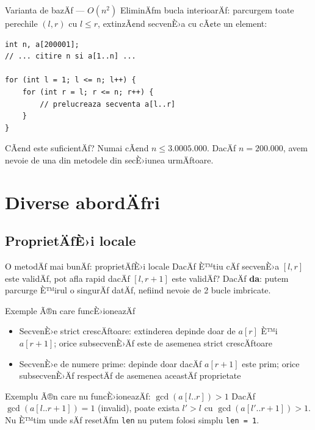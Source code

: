 \documentclass{beamer}
\begin{document}
\begin{frame}[fragile]{Varianta de bazÄƒ --- $O(n^2)$}
  EliminÄƒm bucla interioarÄƒ: parcurgem toate perechile $(l, r)$ cu $l \leq r$, extinzÃ¢nd secvenÈ›a cu cÃ¢te un element:
  \begin{lstlisting}
int n, a[200001];
// ... citire n si a[1..n] ...

for (int l = 1; l <= n; l++) {
    for (int r = l; r <= n; r++) {
        // prelucreaza secventa a[l..r]
    }
}
  \end{lstlisting}
  \begin{block}{CÃ¢nd este suficientÄƒ?}
    Numai cÃ¢nd $n \leq 3{.}000$\textendash$5{.}000$.
    DacÄƒ $n = 200{.}000$, avem nevoie de una din metodele din secÈ›iunea urmÄƒtoare.
  \end{block}
\end{frame}

\section{Diverse abordÄƒri}

\subsection{ProprietÄƒÈ›i locale}

\begin{frame}[shrink]{O metodÄƒ mai bunÄƒ: proprietÄƒÈ›i locale}
  DacÄƒ È™tiu cÄƒ secvenÈ›a $[l, r]$ este validÄƒ, pot afla rapid dacÄƒ $[l, r+1]$ este validÄƒ? DacÄƒ \textbf{da}: putem parcurge È™irul o singurÄƒ datÄƒ, nefiind nevoie de 2 bucle imbricate.
  \smallskip
  \begin{block}{Exemple Ã®n care funcÈ›ioneazÄƒ}
    \begin{itemize}
      \item SecvenÈ›e strict crescÄƒtoare: extinderea depinde doar de $a[r]$ È™i $a[r+1]$; orice subsecvenÈ›Äƒ este de asemenea strict crescÄƒtoare
      \item SecvenÈ›e de numere prime: depinde doar dacÄƒ $a[r+1]$ este prim; orice subsecvenÈ›Äƒ respectÄƒ de asemenea aceastÄƒ proprietate
    \end{itemize}
  \end{block}
  \begin{alertblock}{Exemplu Ã®n care nu funcÈ›ioneazÄƒ: $\gcd(a[l..r]) > 1$}
    DacÄƒ $\gcd(a[l..r{+}1]) = 1$ (invalid), poate exista $l' > l$ cu $\gcd(a[l'..r{+}1]) > 1$.
    Nu È™tim unde sÄƒ resetÄƒm \texttt{len} \textemdash{} nu putem folosi simplu \texttt{len = 1}.
  \end{alertblock}
\end{frame}
\end{document}
